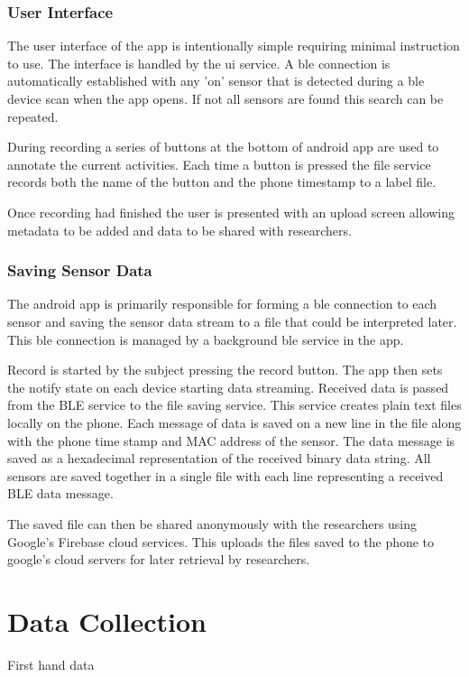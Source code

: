 \subsubsection{User Interface}
The user interface of the app is intentionally simple requiring minimal instruction to use. The interface is handled by the \acrshort{ui} service. A \acrshort{ble} connection is automatically established with any 'on' sensor that is detected during a \acrshort{ble} device scan when the app opens. If not all sensors are found this search can be repeated.

During recording a series of buttons at the bottom of android app are used to annotate the current activities. Each time a button is pressed the file service records both the name of the button and the phone timestamp to a label file.

Once recording had finished the user is presented with an upload screen allowing metadata to be added and data to be shared with researchers.

\subsubsection{Saving Sensor Data}
The android app is primarily responsible for forming a \acrshort{ble} connection to each sensor and saving the sensor data stream to a file that could be interpreted later. This \acrshort{ble} connection is managed by a background \acrshort{ble} service in the app.

Record is started by the subject pressing the record button. The app then sets the notify state on each device starting data streaming. Received data is passed from the BLE service to the file saving service. This service creates plain text files locally on the phone. Each message of data is saved on a new line in the file along with the phone time stamp and MAC address of the sensor. The data message is saved as a hexadecimal representation of the received binary data string. All sensors are saved together in a single file with each line representing a received BLE data message.

The saved file can then be shared anonymously with the researchers using Google's Firebase cloud services. This uploads the files saved to the phone to google's cloud servers for later retrieval by researchers.

\section{Data Collection}
\label{sec:methods-data-collection}
First hand data

